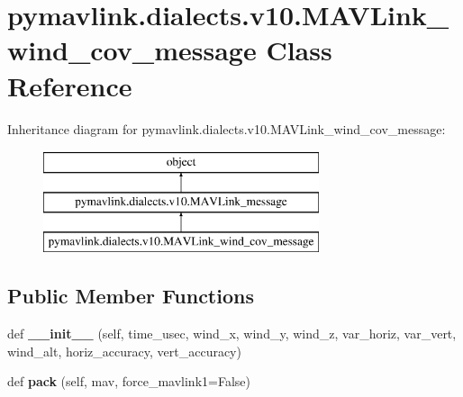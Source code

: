 \hypertarget{classpymavlink_1_1dialects_1_1v10_1_1MAVLink__wind__cov__message}{}\section{pymavlink.\+dialects.\+v10.\+M\+A\+V\+Link\+\_\+wind\+\_\+cov\+\_\+message Class Reference}
\label{classpymavlink_1_1dialects_1_1v10_1_1MAVLink__wind__cov__message}
Inheritance diagram for pymavlink.\+dialects.\+v10.\+M\+A\+V\+Link\+\_\+wind\+\_\+cov\+\_\+message\+:\begin{figure}[H]
\begin{center}
\leavevmode
\includegraphics[height=3.000000cm]{classpymavlink_1_1dialects_1_1v10_1_1MAVLink__wind__cov__message}
\end{center}
\end{figure}
\subsection*{Public Member Functions}
\begin{DoxyCompactItemize}
\item 
\mbox{\label{classpymavlink_1_1dialects_1_1v10_1_1MAVLink__wind__cov__message_a5d366efaee5aaefd47daa82d95f31da6}} 
def {\bfseries \+\_\+\+\_\+init\+\_\+\+\_\+} (self, time\+\_\+usec, wind\+\_\+x, wind\+\_\+y, wind\+\_\+z, var\+\_\+horiz, var\+\_\+vert, wind\+\_\+alt, horiz\+\_\+accuracy, vert\+\_\+accuracy)
\item 
\mbox{\label{classpymavlink_1_1dialects_1_1v10_1_1MAVLink__wind__cov__message_aca972136375d68df4d75854de37748d3}} 
def {\bfseries pack} (self, mav, force\+\_\+mavlink1=False)
\end{DoxyCompactItemize}
